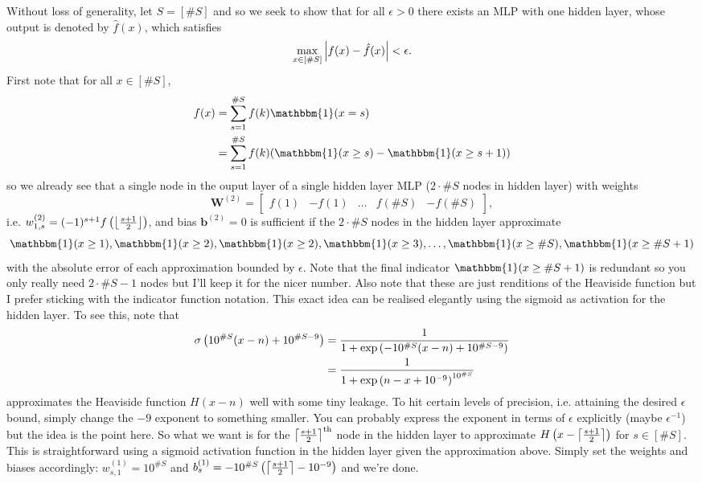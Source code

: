 \documentclass[11pt]{article}
\begin{document}
Without loss of generality, let $S=[\#S]$ and so we seek to show that for all $\epsilon>0$ there exists an MLP with one hidden layer, whose output is denoted by $\hat{f}(x)$, which satisfies
$$
\max_{x\in [\#S]}\left|f(x)-\hat{f}(x)\right|<\epsilon.
$$
First note that for all $x\in[\#S]$,
\begin{align*}
f(x)
&=
\sum_{s=1}^{\#S}f(k)\mathbbm{1}(x=s)\\
&=
\sum_{s=1}^{\#S}f(k)(\mathbbm{1}(x\geq s)-\mathbbm{1}(x\geq s+1))
\end{align*}
so we already see that a single node in the ouput layer of a single hidden layer MLP ($2\cdot\#S$ nodes in hidden layer) with weights
$$
\mathbf{W}^{(2)}
=
\begin{bmatrix}
    f(1) & -f(1) & \dots & f(\#S) & -f(\#S)
\end{bmatrix},
$$
i.e. $w_{1,s}^{(2)}=(-1)^{s+1}f\left(\left\lfloor\frac{s+1}{2}\right\rfloor\right)$, and bias $\mathbf{b}^{(2)}=0$ is sufficient if the $2\cdot\#S$ nodes in the hidden layer approximate
$$
\mathbbm{1}(x\geq1),\mathbbm{1}(x\geq2),\mathbbm{1}(x\geq2),\mathbbm{1}(x\geq3),\dots,\mathbbm{1}(x\geq\#S),\mathbbm{1}(x\geq\#S+1)
$$
with the absolute error of each approximation bounded by $\epsilon$. Note that the final indicator $\mathbbm{1}(x\geq\#S+1)$ is redundant so you only really need $2\cdot\#S-1$ nodes but I'll keep it for the nicer number. Also note that these are just renditions of the Heaviside function but I prefer sticking with the indicator function notation. This exact idea can be realised elegantly using the sigmoid as activation for the hidden layer. To see this, note that
\begin{align*}
    \sigma\left(10^{\#S}(x-n)+10^{\#S-9}\right)
    &=
    \frac{1}{1+\exp\left(-10^{\#S}(x-n)+10^{\#S-9}\right)}\\
    &=
    \frac{1}{1+\exp\left(n-x+10^{-9}\right)^{10^{\#S}}}
\end{align*}
approximates the Heaviside function $H(x-n)$ well with some tiny leakage. To hit certain levels of precision, i.e. attaining the desired $\epsilon$ bound, simply change the $-9$ exponent to something smaller. You can probably express the exponent in terms of $\epsilon$ explicitly (maybe $\epsilon^{-1}$) but the idea is the point here. So what we want is for the $\left\lceil\frac{s+1}{2}\right\rceil^{\text{th}}$ node in the hidden layer to approximate $H\left(x-\left\lceil\frac{s+1}{2}\right\rceil\right)$ for $s\in[\#S]$. This is straightforward using a sigmoid activation function in the hidden layer given the approximation above. Simply set the weights and biases accordingly: $w_{s,1}^{(1)}=10^{\#S}$ and $b_s^{(1)}=-10^{\#S}\left(\left\lceil\frac{s+1}{2}\right\rceil-10^{-9}\right)$ and we're done.
\end{document}
